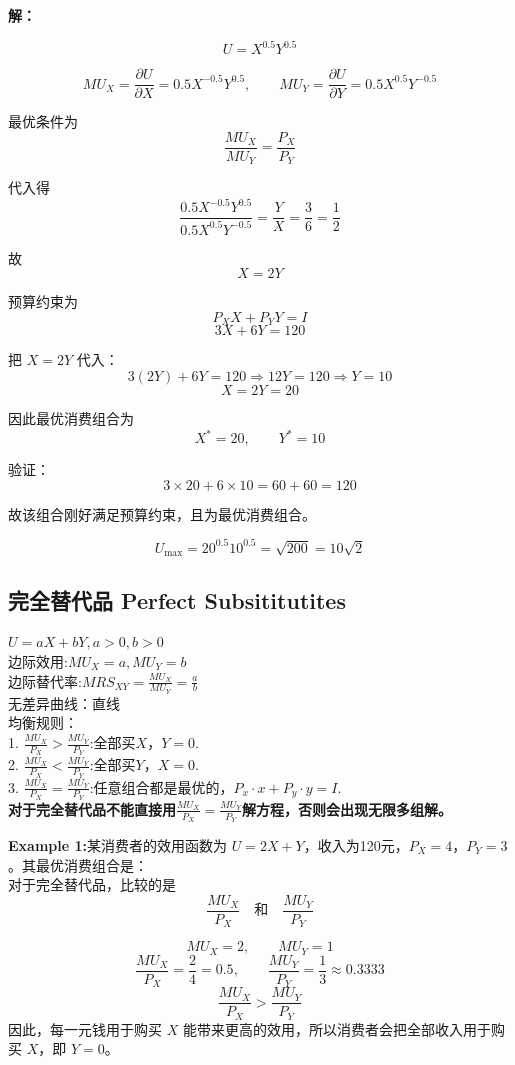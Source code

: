 \documentclass[cn,hazy,blue,14pt,screen]{elegantnote}
\begin{document}
\textbf{解：}

$$
U = X^{0.5}Y^{0.5}
$$

$$
MU_X = \frac{\partial U}{\partial X} = 0.5 X^{-0.5}Y^{0.5},\qquad
MU_Y = \frac{\partial U}{\partial Y} = 0.5 X^{0.5}Y^{-0.5}
$$

最优条件为
$$
\frac{MU_X}{MU_Y} = \frac{P_X}{P_Y}
$$

代入得
$$
\frac{0.5 X^{-0.5}Y^{0.5}}{0.5 X^{0.5}Y^{-0.5}} = \frac{Y}{X} = \frac{3}{6} = \frac12
$$

故
$$
X = 2Y
$$

预算约束为
$$
P_X X + P_Y Y = I
$$
$$
3X + 6Y = 120
$$

把 $X=2Y$ 代入：
$$
3(2Y)+6Y=120 \Rightarrow 12Y=120 \Rightarrow Y=10
$$
$$
X=2Y=20
$$

因此最优消费组合为
$$
X^*=20,\qquad Y^*=10
$$

验证：
$$
3\times 20 + 6\times 10 = 60+60 = 120
$$

故该组合刚好满足预算约束，且为最优消费组合。

$$
U_{\max}=20^{0.5}10^{0.5}=\sqrt{200}=10\sqrt{2}
$$

\subsection{完全替代品 Perfect Subsititutites}
$ U =aX+bY, a>0,b>0$\\
边际效用:$ MU_X = a, MU_Y = b$ \\
边际替代率:$ MRS_{XY} = \frac{MU_X}{MU_Y} = \frac{a}{b}$ \\
无差异曲线：直线\\
均衡规则：\\
1. $\frac{MU_X}{P_X} > \frac{MU_Y}{P_Y}$:全部买$X$，$Y=0$.\\
2. $\frac{MU_X}{P_X} < \frac{MU_Y}{P_Y}$:全部买$Y$，$X=0$.\\
3. $\frac{MU_X}{P_X} = \frac{MU_Y}{P_Y}$:任意组合都是最优的，$P_x \cdot x + P_y \cdot y = I$.\\
\textbf{对于完全替代品不能直接用$\frac{MU_X}{P_X} = \frac{MU_Y}{P_Y}$解方程，否则会出现无限多组解。}

\textbf{Example 1:}某消费者的效用函数为 $U=2X+Y$，收入为120元，$P_X=4$，$P_Y=3$。其最优消费组合是：\\
对于完全替代品，比较的是
$$
\frac{MU_X}{P_X} \quad \text{和} \quad \frac{MU_Y}{P_Y}
$$

$$
MU_X = 2,\qquad MU_Y = 1
$$
$$
\frac{MU_X}{P_X} = \frac{2}{4} = 0.5,\qquad \frac{MU_Y}{P_Y} = \frac{1}{3} \approx 0.3333
$$
$$
\frac{MU_X}{P_X} > \frac{MU_Y}{P_Y}
$$
因此，每一元钱用于购买 $X$ 能带来更高的效用，所以消费者会把全部收入用于购买 $X$，即 $Y=0$。
\end{document}
